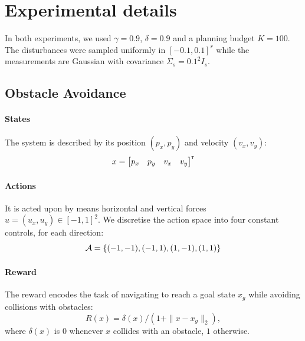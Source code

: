 \documentclass{article}
\begin{document}
\section{Experimental details}
\label{sec:experimental-setting}

In both experiments, we used $\gamma=0.9$,  $\delta=0.9$ and a planning budget $K=100$. The disturbances were sampled uniformly in $[-0.1, 0.1]^r$ while the measurements are Gaussian with covariance $\Sigma_s = 0.1^2 I_s$. 

\subsection{Obstacle Avoidance}

\paragraph{States}

The system is described by its position $(p_x,p_y)$ and velocity $(v_x, v_y)$:
\begin{equation*}
x = \begin{bmatrix}
p_x & p_y & v_x & v_y
\end{bmatrix}^{\mathsf{\scriptscriptstyle T}}
\end{equation*}

\paragraph{Actions}

It is acted upon by means horizontal and vertical forces $u=(u_x, u_y)\in [-1,1]^2$.
We discretise the action space into four constant controls, for each direction:
\begin{equation*}
\mathcal{A} = \{(-1, -1), (-1, 1), (1, -1), (1, 1)\}
\end{equation*}

\paragraph{Reward}

The reward encodes the task of navigating to reach a goal state $x_g$ while avoiding collisions with obstacles: $$R(x) = \delta(x)/(1 + \|x - x_g\|_2),$$  where $\delta(x)$ is $0$ whenever $x$ collides with an obstacle, $1$ otherwise.
\end{document}
